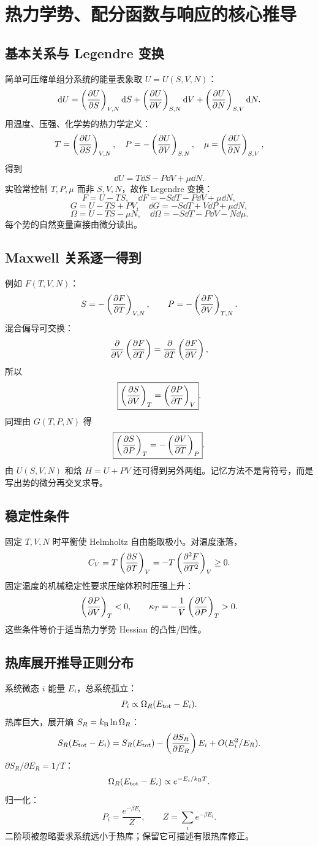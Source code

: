 \chapter{热力学势、配分函数与响应的核心推导}

\section{基本关系与 Legendre 变换}
简单可压缩单组分系统的能量表象取
$U=U(S,V,N)$：
\[
\mathrm d U=\left(\frac{\partial U}{\partial S}\right)_{V,N}\mathrm d S
+\left(\frac{\partial U}{\partial V}\right)_{S,N}\mathrm d V
+\left(\frac{\partial U}{\partial N}\right)_{S,V}\mathrm d N.
\]
用温度、压强、化学势的热力学定义：
\[
T=\left(\frac{\partial U}{\partial S}\right)_{V,N},\quad
P=-\left(\frac{\partial U}{\partial V}\right)_{S,N},\quad
\mu=\left(\frac{\partial U}{\partial N}\right)_{S,V},
\]
得到
\[
\boxed{\dd U=T\dd S-P\dd V+\mu\dd N}.
\]
实验常控制 $T,P,\mu$ 而非 $S,V,N$，故作 Legendre 变换：
\[
F=U-TS,\quad
\dd F=-S\dd T-P\dd V+\mu\dd N,
\]
\[
G=U-TS+PV,\quad
\dd G=-S\dd T+V\dd P+\mu\dd N,
\]
\[
\Omega=U-TS-\mu N,\quad
\dd\Omega=-S\dd T-P\dd V-N\dd\mu.
\]
每个势的自然变量直接由微分读出。

\section{Maxwell 关系逐一得到}
例如 $F(T,V,N)$：
\[
S=-\left(\frac{\partial F}{\partial T}\right)_{V,N},\qquad
P=-\left(\frac{\partial F}{\partial V}\right)_{T,N}.
\]
混合偏导可交换：
\[
\frac{\partial }{\partial V}\left(\frac{\partial F}{\partial T}\right)
=\frac{\partial }{\partial T}\left(\frac{\partial F}{\partial V}\right),
\]
所以
\[
\boxed{\left(\frac{\partial S}{\partial V}\right)_T
=\left(\frac{\partial P}{\partial T}\right)_V}.
\]
同理由 $G(T,P,N)$ 得
\[
\boxed{\left(\frac{\partial S}{\partial P}\right)_T
=-\left(\frac{\partial V}{\partial T}\right)_P}.
\]
由 $U(S,V,N)$ 和焓 $H=U+PV$ 还可得到另外两组。记忆方法不是背符号，而是写出势的微分再交叉求导。

\section{稳定性条件}
固定 $T,V,N$ 时平衡使 Helmholtz 自由能取极小。对温度涨落，
\[
C_V=T\left(\frac{\partial S}{\partial T}\right)_V
=-T\left(\frac{\partial^2 F}{\partial T^2}\right)_V\ge0.
\]
固定温度的机械稳定性要求压缩体积时压强上升：
\[
\left(\frac{\partial P}{\partial V}\right)_T<0,\qquad
\kappa_T=-\frac1V\left(\frac{\partial V}{\partial P}\right)_T>0.
\]
这些条件等价于适当热力学势 Hessian 的凸性/凹性。

\section{热库展开推导正则分布}
系统微态 $i$ 能量 $E_i$，总系统孤立：
\[
P_i\propto\Omega_R(E_{\rm tot}-E_i).
\]
热库巨大，展开熵
$S_R=k_{\mathrm B}\ln\Omega_R$：
\[
S_R(E_{\rm tot}-E_i)
=S_R(E_{\rm tot})
-\left(\frac{\partial S_R}{\partial E_R}\right)E_i
+O(E_i^2/E_R).
\]
$\partial S_R/\partial E_R=1/T$：
\[
\Omega_R(E_{\rm tot}-E_i)
\propto e^{-E_i/k_{\mathrm B} T}.
\]
归一化：
\[
\boxed{P_i=\frac{e^{-\beta E_i}}Z},\qquad
Z=\sum_ie^{-\beta E_i}.
\]
二阶项被忽略要求系统远小于热库；保留它可描述有限热库修正。

